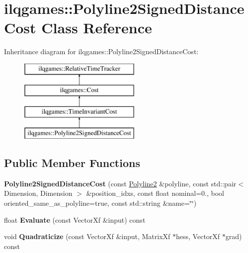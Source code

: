 \hypertarget{classilqgames_1_1_polyline2_signed_distance_cost}{}\section{ilqgames\+:\+:Polyline2\+Signed\+Distance\+Cost Class Reference}
\label{classilqgames_1_1_polyline2_signed_distance_cost}
Inheritance diagram for ilqgames\+:\+:Polyline2\+Signed\+Distance\+Cost\+:\begin{figure}[H]
\begin{center}
\leavevmode
\includegraphics[height=4.000000cm]{classilqgames_1_1_polyline2_signed_distance_cost}
\end{center}
\end{figure}
\subsection*{Public Member Functions}
\begin{DoxyCompactItemize}
\item 
{\bfseries Polyline2\+Signed\+Distance\+Cost} (const \hyperlink{classilqgames_1_1_polyline2}{Polyline2} \&polyline, const std\+::pair$<$ Dimension, Dimension $>$ \&position\+\_\+idxs, const float nominal=0., bool oriented\+\_\+same\+\_\+as\+\_\+polyline=true, const std\+::string \&name=\char`\"{}\char`\"{})\hypertarget{classilqgames_1_1_polyline2_signed_distance_cost_a5eee356b43a0bbf0fdf2325e32e7f9a7}{}\label{classilqgames_1_1_polyline2_signed_distance_cost_a5eee356b43a0bbf0fdf2325e32e7f9a7}

\item 
float {\bfseries Evaluate} (const Vector\+Xf \&input) const \hypertarget{classilqgames_1_1_polyline2_signed_distance_cost_acf991d382328987f0757fa299d58f869}{}\label{classilqgames_1_1_polyline2_signed_distance_cost_acf991d382328987f0757fa299d58f869}

\item 
void {\bfseries Quadraticize} (const Vector\+Xf \&input, Matrix\+Xf $\ast$hess, Vector\+Xf $\ast$grad) const \hypertarget{classilqgames_1_1_polyline2_signed_distance_cost_a26d830bf62ef4b4e0827f8cbf779b21c}{}\label{classilqgames_1_1_polyline2_signed_distance_cost_a26d830bf62ef4b4e0827f8cbf779b21c}

\end{DoxyCompactItemize}
